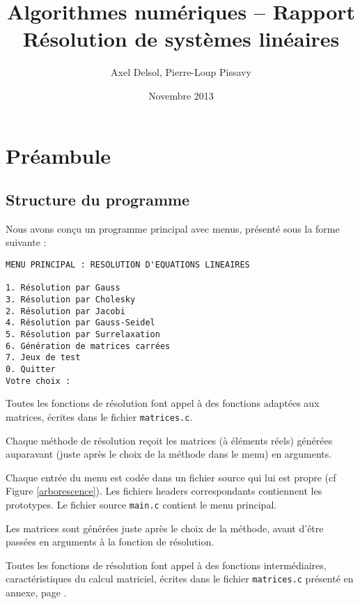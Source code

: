 \documentclass{report}
\title{Algorithmes numériques -- Rapport \\ \vspace{0.5cm}Résolution de systèmes linéaires}
\author{Axel Delsol, Pierre-Loup Pissavy}
\date{Novembre 2013}
\begin{document}
  \maketitle
  \tableofcontents

  \chapter{Préambule}
  	\section{Structure du programme}
    Nous avons conçu un programme principal avec menus, présenté sous la forme suivante :

    \begin{lstlisting}[style=apercu, name=Menu Principal]
MENU PRINCIPAL : RESOLUTION D'EQUATIONS LINEAIRES

1. Résolution par Gauss
3. Résolution par Cholesky
2. Résolution par Jacobi
4. Résolution par Gauss-Seidel
5. Résolution par Surrelaxation
6. Génération de matrices carrées
7. Jeux de test
0. Quitter
Votre choix : 
	\end{lstlisting}
	
	Toutes les fonctions de résolution font appel à des fonctions adaptées aux matrices, écrites dans le fichier \verb"matrices.c".
    \vspace{0.3cm}
    
    Chaque méthode de résolution reçoit les matrices (à éléments réels) générées auparavant (juste après le choix de la méthode dans le menu) en arguments.
    \vspace{0.3cm}
    	
	Chaque entrée du menu est codée dans un fichier source qui lui est propre (cf Figure \ref{arborescence}). Les fichiers headers correspondants contiennent les prototypes. Le fichier source \verb"main.c" contient le menu principal.
	\vspace{0.3cm}
	
    Les matrices sont générées juste après le choix de la méthode, avant d'être passées en arguments à la fonction de résolution.

    
    \vspace{0.3cm}

  Toutes les fonctions de résolution font appel à des fonctions intermédiaires, caractéristiques du calcul matriciel, écrites dans le fichier \verb"matrices.c" présenté en annexe, page \pageref{sourceMatrices}.
  \vspace{0.3cm}
\end{document}
